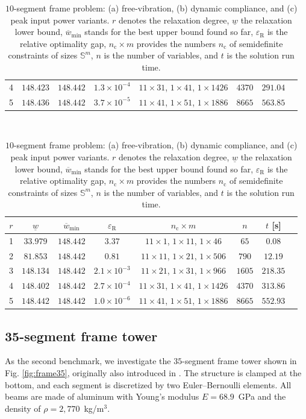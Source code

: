 \documentclass[preprint,3p]{elsarticle}
\newcommand{\R}{\mathrm{R}}
\numberwithin{equation}{section}
\begin{document}
\begin{table}[!t]
\begin{subtable}{\linewidth}
\begin{tabular}{cccccccc}
4 & $148.423$ & $148.442$ & $1.3\times 10^{-4}$ & $11\times31$, $1\times41$, $1\times1426$ & $4370$ & $291.04$\\
5 & $148.436$ & $148.442$ & $3.7\times 10^{-5}$ & $11\times41$, $1\times51$, $1\times1886$ & $8665$ & $563.85$
\end{tabular}
\caption{}
\label{tab:frame20_dc}
\end{subtable}\\
\begin{subtable}{\linewidth}
\centering
\begin{tabular}{cccccccc}
$r$ & $\underline{w}$ & $\overline{w}_{\min}$ & $\varepsilon_\R$ & $n_\mathrm{c} \times m$ & $n$ & $t$ [s]\\
\hline 1 & $33.979$ & $148.442$ & $3.37$ & $11\times 1$, $1\times11$, $1\times 46$ & $65$ & $0.08$ \\
2 & $81.853$ & $148.442$ & $0.81$ & $11\times 11$, $1\times 21$, $1\times 506$ & $790$ & $12.19$\\
3 & $148.134$ & $148.442$ & $2.1\times 10^{-3}$ & $11\times21$, $1\times31$, $1\times966$ & $1605$ & $218.35$\\
4 & $148.402$ & $148.442$ & $2.7\times 10^{-4}$ & $11\times31$, $1\times41$, $1\times1426$ & $4370$ & $313.86$\\
5 & $148.442$ & $148.442$ & $1.0\times 10^{-6}$ & $11\times41$, $1\times51$, $1\times1886$ & $8665$ & $552.93$
\end{tabular}
\caption{}
\label{tab:frame20_pp}
\end{subtable}
\caption{$10$-segment frame problem: (a) free-vibration, (b) dynamic compliance, and (c) peak input power variants. $r$ denotes the relaxation degree, $\underline{w}$ the relaxation lower bound, $\overline{w}_{\min}$ stands for the best upper bound found so far, $\varepsilon_\R$ is the relative optimality gap, $n_\mathrm{c} \times m$ provides the numbers $n_\mathrm{c}$ of semidefinite constraints of sizes $\mathbb{S}^m$, $n$ is the number of variables, and $t$ is the solution run time.}
\end{table}

\subsection{35-segment frame tower}

As the second benchmark, we investigate the $35$-segment frame tower shown in Fig. \ref{fig:frame35}, originally also introduced in \citep{Ni2014}. The structure is clamped at the bottom, and each segment is discretized by two Euler--Bernoulli elements. All beams are made of aluminum with Young's modulus $E=68.9$~GPa and the density of $\rho=2,770$~kg/m$^3$.
\end{document}
